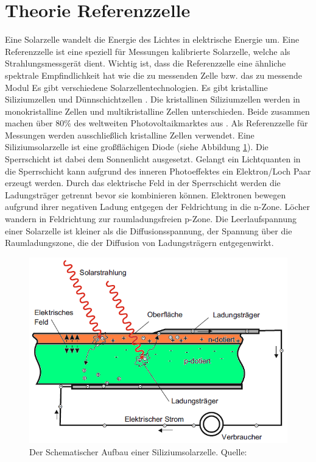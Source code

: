 \documentclass[a4paper,bibtotoc,oneside]{scrbook}
\begin{document}
\section{Theorie Referenzzelle}\thispagestyle{empty}
Eine Solarzelle wandelt die Energie des Lichtes in elektrische Energie um. Eine Referenzzelle ist eine speziell für Messungen kalibrierte Solarzelle, welche als Strahlungsmessgerät dient. Wichtig ist, dass die Referenzzelle eine ähnliche spektrale Empfindlichkeit hat wie die zu messenden Zelle bzw. das zu messende Modul
Es gibt verschiedene Solarzellentechnologien. Es gibt kristalline Siliziumzellen und Dünnschichtzellen . Die kristallinen Siliziumzellen werden in monokristalline Zellen und multikristalline Zellen unterschieden. Beide zusammen machen über 80\% des weltweiten Photovoltaikmarktes aus \cite{iea00}. Als Referenzzelle für Messungen werden ausschließlich kristalline Zellen verwendet. 
Eine Siliziumsolarzelle ist eine großflächigen Diode (siehe Abbildung \ref{cell}). Die Sperrschicht ist dabei dem Sonnenlicht ausgesetzt. Gelangt ein Lichtquanten in die Sperrschicht kann aufgrund des inneren Photoeffektes ein Elektron/Loch Paar erzeugt werden. Durch das elektrische Feld in der Sperrschicht werden die Ladungsträger getrennt bevor sie kombinieren können. Elektronen bewegen aufgrund ihrer negativen Ladung entgegen der Feldrichtung in die n-Zone. Löcher wandern in Feldrichtung zur raumladungsfreien p-Zone. Die Leerlaufspannung einer Solarzelle ist kleiner als die Diffusionsspannung, der Spannung über die Raumladungszone, die der Diffusion von Ladungsträgern entgegenwirkt.
\begin{figure}[htbp]
\centering
\includegraphics[width=125mm]{img/zelle2.png}
\caption{Der Schematischer Aufbau einer Siliziumsolarzelle. Quelle: \cite{pv}}\label{cell}
\end{figure}
\end{document}
